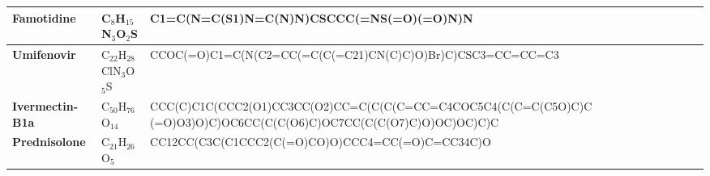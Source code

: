 \documentclass[conference]{IEEEtran}
\begin{document}
\begin{table}[h]
\begin{tabular}{|>{\bfseries}l|l|p{10cm}|}
    \hline
    Famotidine                               & C$_{8}$H$_{15}$N$_3$O$_2$S             & C1=C(N=C(S1)N=C(N)N)CSCCC(=NS(=O)(=O)N)N                                                                                                                                                                                                                                                                                                                                                                                                                                                                                                                                        \\
    \hline
    Umifenovir                               & C$_{22}$H$_{28}$ClN$_3$O$_5$S          & CCOC(=O)C1=C(N(C2=CC(=C(C(=C21)CN(C)C)O)Br)C)CSC3=CC=CC=C3                                                                                                                                                                                                                                                                                                                                                                                                                                                                                                                      \\
    \hline
    Ivermectin-B1a                           & C$_{50}$H$_{76}$O$_{14}$               & CCC(C)C1C(CCC2(O1)CC3CC(O2)CC=C(C(C(C=CC=C4COC5C4(C(C=C(C5O)C)C \newline (=O)O3)O)C)OC6CC(C(C(O6)C)OC7CC(C(C(O7)C)O)OC)OC)C)C                                                                                                                                                                                                                                                                                                                                                                                                                                                   \\
    \hline
    Prednisolone                             & C$_{21}$H$_{26}$O$_5$                  & CC12CC(C3C(C1CCC2(C(=O)CO)O)CCC4=CC(=O)C=CC34C)O                                                                                                                                                                                                                                                                                                                                                                                                                                                                                                                                \\

\end{tabular}
\end{table}
\end{document}
